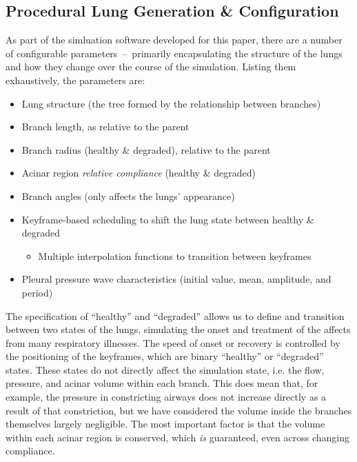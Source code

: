 \subsection{Procedural Lung Generation \& Configuration}

As part of the simluation software developed for this paper, there are a number of configurable
parameters~--~primarily encapsulating the structure of the lungs and how they change over the course
of the simulation. Listing them exhaustively, the parameters are:

\begin{itemize}
\item Lung structure (the tree formed by the relationship between branches)
\item Branch length, as relative to the parent
\item Branch radius (healthy \& degraded), relative to the parent
\item Acinar region \textit{relative compliance} (healthy \& degraded)
\item Branch angles (only affects the lungs' appearance)
\item Keyframe-based scheduling to shift the lung state between healthy \& degraded
    \begin{itemize}
    \item Multiple interpolation functions to transition between keyframes
    \end{itemize}
\item Pleural pressure wave characteristics (initial value, mean, amplitude, and period)
\end{itemize}

The specification of ``healthy'' and ``degraded'' allows us to define and transition between two
states of the lungs, simulating the onset and treatment of the affects from many respiratory
illnesses. The speed of onset or recovery is controlled by the positioning of the keyframes, which
are binary ``healthy'' or ``degraded'' states. These states do not directly affect the simulation
state, i.e. the flow, pressure, and acinar volume within each branch. This does mean that, for
example, the pressure in constricting airways does not increase directly as a result of that
constriction, but we have considered the volume inside the branches themselves largely negligible.
The most important factor is that the volume within each acinar region is conserved, which
\textit{is} guaranteed, even across changing compliance.

\breakpars


